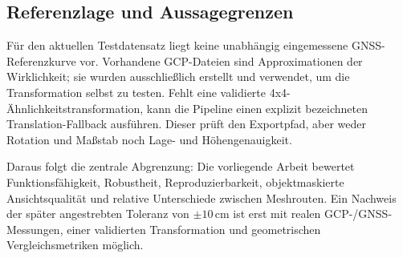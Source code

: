 \subsection{Referenzlage und Aussagegrenzen}

Für den aktuellen Testdatensatz liegt keine unabhängig eingemessene
GNSS-Referenzkurve vor. Vorhandene GCP-Dateien sind Approximationen der
Wirklichkeit; sie wurden ausschließlich erstellt und verwendet, um die
Transformation selbst zu testen. Fehlt eine validierte
4x4-Ähnlichkeitstransformation, kann die Pipeline einen explizit bezeichneten
Translation-Fallback ausführen. Dieser prüft den Exportpfad, aber weder Rotation
und Maßstab noch Lage- und Höhengenauigkeit.

Daraus folgt die zentrale Abgrenzung: Die vorliegende Arbeit bewertet Funktionsfähigkeit,
Robustheit, Reproduzierbarkeit, objektmaskierte Ansichtsqualität und relative
Unterschiede zwischen Meshrouten. Ein Nachweis der später angestrebten
Toleranz von $\pm10\,\mathrm{cm}$ ist erst mit realen GCP-/GNSS-Messungen,
einer validierten Transformation und geometrischen Vergleichsmetriken möglich.
